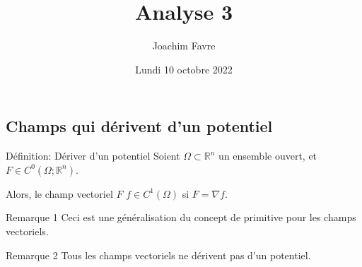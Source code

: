 \documentclass[a4paper]{article}
\title{Analyse 3}
\author{Joachim Favre}
\date{Lundi 10 octobre 2022}
\begin{document}
\maketitle


\subsection{Champs qui dérivent d'un potentiel}
\begin{parag}{Définition: Dériver d'un potentiel}
    Soient $\Omega \subset \mathbb{R}^n$ un ensemble ouvert, et $F \in C^{0}\left(\Omega;\mathbb{R}^n\right)$.

    Alors, le champ vectoriel $F$  $f \in C^{1}\left(\Omega\right)$ si $F = \nabla f$.

    \begin{subparag}{Remarque 1}
        Ceci est une généralisation du concept de primitive pour les champs vectoriels.
    \end{subparag}

    \begin{subparag}{Remarque 2}
        Tous les champs vectoriels ne dérivent pas d'un potentiel.
    \end{subparag}
    
\end{parag}
\end{document}
